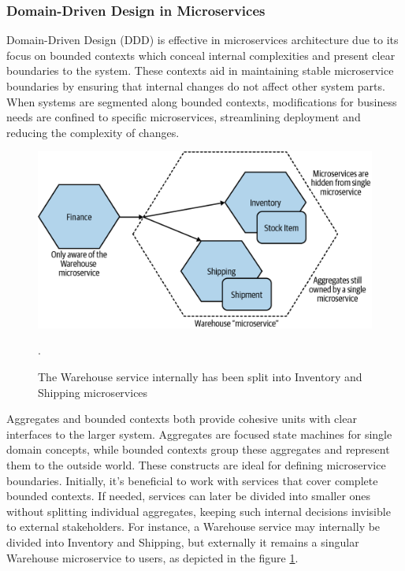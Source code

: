 \subsubsection{Domain-Driven Design in Microservices}
Domain-Driven Design (DDD) is effective in microservices architecture due to its focus on bounded
contexts which conceal internal complexities and present clear boundaries to the system. These
contexts aid in maintaining stable microservice boundaries by ensuring that internal changes do not
affect other system parts. When systems are segmented along bounded contexts, modifications for
business needs are confined to specific microservices, streamlining deployment and reducing the
complexity of changes.

\newpage

\begin{figure}
    \centering
    \includegraphics[scale=0.5]{Pictures/3_ddd.png}
    \caption{The Warehouse service internally has been split into Inventory and Shipping microservices}.
    \label{fig:3_ddd}
\end{figure}

Aggregates and bounded contexts both provide cohesive units with clear interfaces to the larger
system. Aggregates are focused state machines for single domain concepts, while bounded contexts
group these aggregates and represent them to the outside world. These constructs are ideal for
defining microservice boundaries. Initially, it's beneficial to work with services that cover
complete bounded contexts. If needed, services can later be divided into smaller ones without
splitting individual aggregates, keeping such internal decisions invisible to external stakeholders.
For instance, a Warehouse service may internally be divided into Inventory and Shipping, but
externally it remains a singular Warehouse microservice to users, as depicted in the figure
\ref{fig:3_ddd}.


